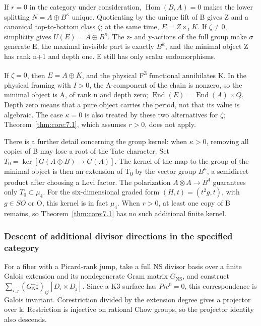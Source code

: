 \documentclass[11pt,a4paper,oneside]{article}
\theoremstyle{plain}
\theoremstyle{definition}
\theoremstyle{remark}
\numberwithin{equation}{section}
\begin{document}
If \(r=0\) in the category under consideration, \(\operatorname{Hom}(B,A)=0\) makes the lower splitting \(N=A\oplus B^\kappa \) unique. Quotienting by the unique lift of B gives Z and a canonical top-to-bottom class \(\zeta \); at the same time, \(E=Z\times _{1}K\). If \(\zeta \ne 0\), simplicity gives \(U(E)=A\oplus B^\kappa \). The z- and y-actions of the full group make \(\sigma \) generate E, the maximal invisible part is exactly \(B^\kappa \), and the minimal object Z has rank n+1 and depth one. E still has only scalar endomorphisms.

If \(\zeta =0\), then \(E=A\oplus K\), and the physical F\textsuperscript{3} functional annihilates K. In the physical framing with \(I>0\), the A-component of the chain is nonzero, so the minimal object is A, of rank n and depth zero; \(\operatorname{End}(E)=\operatorname{End}(A)\times Q\). Depth zero means that a pure object carries the period, not that its value is algebraic. The case \(\kappa =0\) is also treated by these two alternatives for \(\zeta \); Theorem~\ref{thm:core:7.1}, which assumes \(r>0\), does not apply.

There is a further detail concerning the group kernel: when \(\kappa >0\), removing all copies of B may lose a root of the Tate character. Set \(T_{0}=\operatorname{ker}[G(A\oplus B)\to G(A)]\). The kernel of the map to the group of the minimal object is then an extension of T\textsubscript{0} by the vector group \(B^\kappa \), a semidirect product after choosing a Levi factor. The polarization \(A\otimes A\to B^{4}\) guarantees only \(T_{0}\subset \mu _{4}\). For the six-dimensional graded form \((H,t)=(t^{2}g,t)\), with \(g\in SO\) or O, this kernel is in fact \(\mu _{4}\). When \(r>0\), at least one copy of B remains, so Theorem~\ref{thm:core:7.1} has no such additional finite kernel.

\subsubsection{Descent of additional divisor directions in the specified category}\label{sec:core:7.5}

For a fiber with a Picard-rank jump, take a full NS divisor basis over a finite Galois extension and its nondegenerate Gram matrix \(G_{\mathrm{NS}}\), and construct \(\sum_{i,j}(G_{\mathrm{NS}}^{-1})_{ij}[D_i\times D_j]\). Since a K3 surface has \(Pic^{0}=0\), this correspondence is Galois invariant. Corestriction divided by the extension degree gives a projector over k. Restriction is injective on rational Chow groups, so the projector identity also descends.
\end{document}
